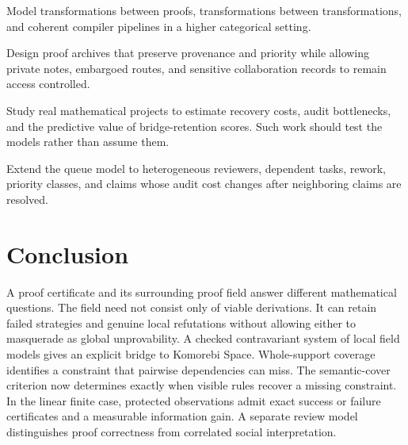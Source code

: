 \begin{PPTproblem}
\label{PPT:res:28:8}
Model transformations between proofs, transformations between transformations, and coherent compiler pipelines in a higher categorical setting.
\end{PPTproblem}

\begin{PPTproblem}
\label{PPT:res:28:9}
Design proof archives that preserve provenance and priority while allowing private notes, embargoed routes, and sensitive collaboration records to remain access controlled.
\end{PPTproblem}

\begin{PPTproblem}
\label{PPT:res:28:10}
Study real mathematical projects to estimate recovery costs, audit bottlenecks, and the predictive value of bridge-retention scores. Such work should test the models rather than assume them.
\end{PPTproblem}

\begin{PPTproblem}
\label{PPT:res:28:11}
Extend the queue model to heterogeneous reviewers, dependent tasks, rework, priority classes, and claims whose audit cost changes after neighboring claims are resolved.
\end{PPTproblem}



\section{Conclusion}
\label{PPT:sec:old29}

A proof certificate and its surrounding proof field answer different mathematical questions. The field need not consist only of viable derivations. It can retain failed strategies and genuine local refutations without allowing either to masquerade as global unprovability. A checked contravariant system of local field models gives an explicit bridge to Komorebi Space. Whole-support coverage identifies a constraint that pairwise dependencies can miss. The semantic-cover criterion now determines exactly when visible rules recover a missing constraint. In the linear finite case, protected observations admit exact success or failure certificates and a measurable information gain. A separate review model distinguishes proof correctness from correlated social interpretation.




